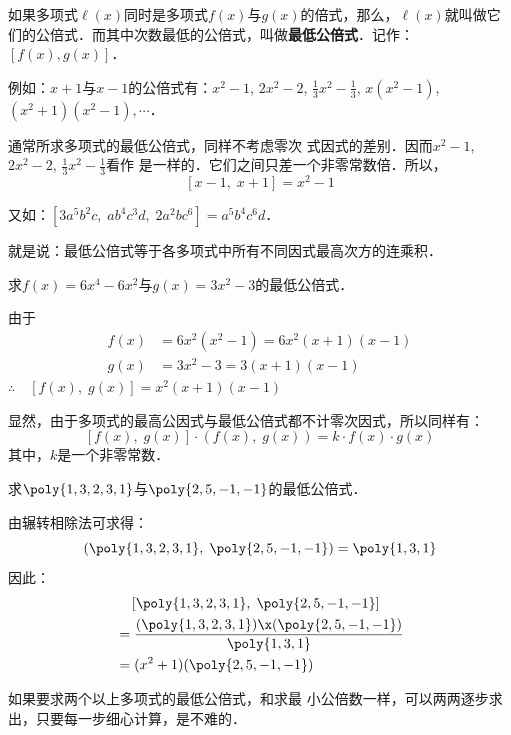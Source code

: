 如果多项式$\ell(x)$同时是多项式$f(x)$与$g(x)$的倍式，那么，$\ell(x)$就叫做它们的公倍式．而其中次数最低的公倍式，叫做\textbf{最低公倍式}．记作：$[f(x),g(x)]$．

例如：$x+1$与$x-1$的公倍式有：$x^2-1$, $2x^2-2$, $\frac{1}{3}x^2-\frac{1}{3}$, $x (x^2-1)$, $(x^2+1)(x^2-1),\cdots$．

通常所求多项式的最低公倍式，同样不考虑零次
式因式的差别．因而$x^2-1$, $2x^2-2$, $\frac{1}{3}x^2-\frac{1}{3}$看作
是一样的．它们之间只差一个非零常数倍．所以，
\[[x-1,\; x+1]=x^2-1\]

又如：$[3a^5b^2c,\; ab^4c^3d,\; 2a^2bc^6]=a^5b^4c^6d$．

就是说：最低公倍式等于各多项式中所有不同因式最高次方的连乘积．

\begin{example}
求$f(x)=6x^4-6x^2$与$g(x)=3x^2-3$的最低公倍式．
\end{example}

\begin{solution}
由于
\[\begin{split}
    f(x)&=6x^2(x^2-1)=6x^2(x+1)(x-1)\\
    g(x)&=3x^2-3=3(x+1)(x-1)
\end{split}\]
$\therefore\quad [f(x),\; g(x)]=x^2(x+1)(x-1)$
\end{solution}

显然，由于多项式的最高公因式与最低公倍式都不计零次因式，所以同样有：
\[[f (x) ,\; g (x) ] \cdot  (f (x) ,\; g (x) ) =k\cdot f (x) \cdot g (x) \]
其中，$k$是一个非零常数．

\begin{example}
求$\poly{1,3,2,3,1}$与$\poly{2,5,-1,-1}$的最低公倍式．
\end{example}

\begin{solution}
由辗转相除法可求得：
\[\left(\poly{1,3,2,3,1}, \; \poly{2,5,-1,-1}\right)=\poly{1,3,1}\]
因此：
\[\begin{split}
    &\quad \left[\poly{1,3,2,3,1}, \; \poly{2,5,-1,-1}\right]\\
    &=\frac{(\poly{1,3,2,3,1})\x (\poly{2,5,-1,-1})}{\poly{1,3,1}}\\
    &=(x^2+1)(\poly{2,5,-1,-1})
\end{split}\]

如果要求两个以上多项式的最低公倍式，和求最
小公倍数一样，可以两两逐步求出，只要每一步细心计算，是不难的．
\end{solution}




